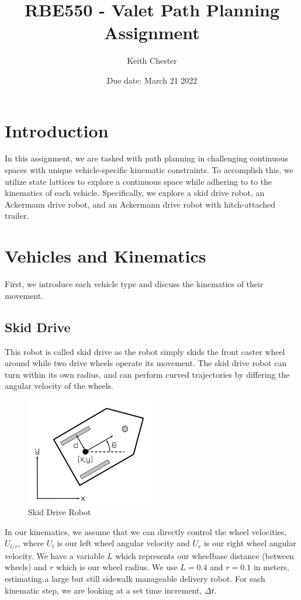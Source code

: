 \documentclass{article}
\title{RBE550 - Valet Path Planning Assignment}
\author{Keith Chester}
\date{Due date: March 21 2022}
\begin{document}
\maketitle

\section*{Introduction}
In this assignment, we are tasked with path planning in challenging continuous spaces with unique vehicle-specific kinematic constraints. To accomplish this, we utilize state lattices to explore a continuous space while adhering to to the kinematics of each vehicle. Specifically, we explore a skid drive robot, an Ackermann drive robot, and an Ackermann drive robot with hitch-attached trailer.

\section*{Vehicles and Kinematics}

First, we introduce each vehicle type and discuss the kinematics of their movement.

\subsection*{Skid Drive}
This robot is called skid drive as the robot simply skids the front caster wheel around while two drive wheels operate its movement. The skid drive robot can turn within its own radius, and can perform curved trajectories by differing the angular velocity of the wheels.

\begin{figure}[H]
    \centering
    \includegraphics[width = 0.5\textwidth]{imgs/skid.png}
    \caption{Skid Drive Robot}
    \label{fig:skid-drive}
\end{figure}

In our kinematics, we assume that we can directly control the wheel velocities, $U_{l/r}$, where $U_l$ is our left wheel angular velocity and $U_r$ is our right wheel angular velocity. We have a variable $L$ which represents our wheelbase distance (between wheels) and $r$ which is our wheel radius. We use $L=0.4$ and $r=0.1$ in meters, estimating a large but still sidewalk manageable delivery robot. For each kinematic step, we are looking at a set time increment, $\Delta t$.
\end{document}
